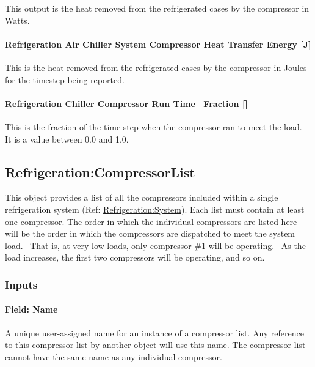 This output is the heat removed from the refrigerated cases by the compressor in Watts.

\paragraph{Refrigeration Air Chiller System Compressor Heat Transfer Energy {[}J{]}}\label{refrigeration-air-chiller-system-compressor-heat-transfer-energy-j}

This is the heat removed from the refrigerated cases by the compressor in Joules for the timestep being reported.

\paragraph{Refrigeration Chiller Compressor Run Time~ Fraction {[]}}\label{refrigeration-chiller-compressor-run-time-fraction}

This is the fraction of the time step when the compressor ran to meet the load.~ It is a value between 0.0 and 1.0.

\subsection{Refrigeration:CompressorList}\label{refrigerationcompressorlist}

This object provides a list of all the compressors included within a single refrigeration system (Ref: \hyperref[refrigerationsystem]{Refrigeration:System}). Each list must contain at least one compressor. The order in which the individual compressors are listed here will be the order in which the compressors are dispatched to meet the system load.~ That is, at very low loads, only compressor \#1 will be operating.~ As the load increases, the first two compressors will be operating, and so on.

\subsubsection{Inputs}\label{inputs-6-020}

\paragraph{Field: Name}\label{field-name-7-016}

A unique user-assigned name for an instance of a compressor list. Any reference to this compressor list by another object will use this name. The compressor list cannot have the same name as any individual compressor.

